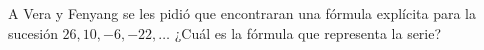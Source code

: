 A Vera y Fenyang se les pidió que encontraran una fórmula explícita para la sucesión $26,10,-6,-22, \dots$
¿Cu\'al es la f\'ormula que representa la serie? \fillin[$26-16(n-1)$]
